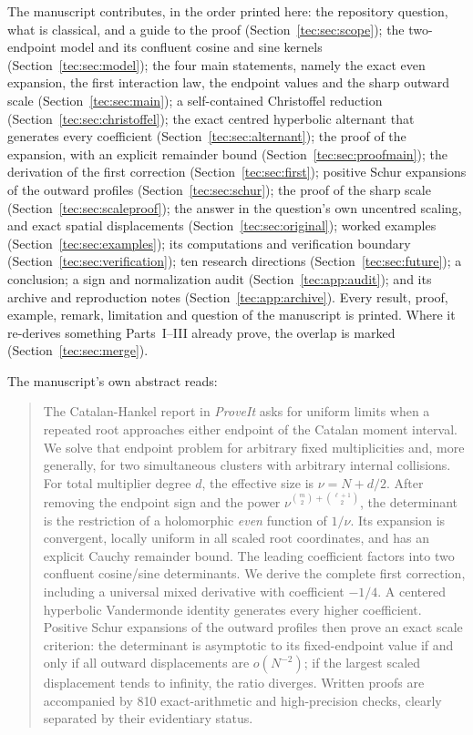 \documentclass[11pt,a4paper]{article}
\numberwithin{equation}{section}
\theoremstyle{definition}
\theoremstyle{remark}
\begin{document}
The manuscript contributes, in the order printed here: the repository
question, what is classical, and a guide to the proof
(Section~\ref{tec:sec:scope}); the two-endpoint model and its confluent
cosine and sine kernels (Section~\ref{tec:sec:model}); the four main
statements, namely the exact even expansion, the first interaction law, the
endpoint values and the sharp outward scale (Section~\ref{tec:sec:main});
a self-contained Christoffel reduction (Section~\ref{tec:sec:christoffel});
the exact centred hyperbolic alternant that generates every coefficient
(Section~\ref{tec:sec:alternant}); the proof of the expansion, with an
explicit remainder bound (Section~\ref{tec:sec:proofmain}); the derivation
of the first correction (Section~\ref{tec:sec:first}); positive Schur
expansions of the outward profiles (Section~\ref{tec:sec:schur}); the
proof of the sharp scale (Section~\ref{tec:sec:scaleproof}); the answer in
the question's own uncentred scaling, and exact spatial displacements
(Section~\ref{tec:sec:original}); worked examples
(Section~\ref{tec:sec:examples}); its computations and verification
boundary (Section~\ref{tec:sec:verification}); ten research directions
(Section~\ref{tec:sec:future}); a conclusion; a sign and normalization
audit (Section~\ref{tec:app:audit}); and its archive and reproduction
notes (Section~\ref{tec:app:archive}).  Every result, proof, example,
remark, limitation and question of the manuscript is printed.  Where it
re-derives something Parts~I--III already prove, the overlap is marked
(Section~\ref{tec:sec:merge}).

The manuscript's own abstract reads:
\begin{quote}\small
The Catalan-Hankel report in \textit{ProveIt} asks for uniform limits when
a repeated root approaches either endpoint of the Catalan moment interval.
We solve that endpoint problem for arbitrary fixed multiplicities and, more
generally, for two simultaneous clusters with arbitrary internal
collisions. For total multiplier degree $d$, the effective size is
$\nu=N+d/2$. After removing the endpoint sign and the power
$\nu^{\binom m2+\binom{\ell+1}2}$, the determinant is the restriction of a
holomorphic \emph{even} function of $1/\nu$. Its expansion is convergent,
locally uniform in all scaled root coordinates, and has an explicit
Cauchy remainder bound. The leading coefficient factors into two
confluent cosine/sine determinants. We derive the complete first
correction, including a universal mixed derivative with coefficient
$-1/4$. A centered hyperbolic Vandermonde identity generates every higher
coefficient. Positive Schur expansions of the outward profiles then prove
an exact scale criterion: the determinant is asymptotic to its
fixed-endpoint value if and only if all outward displacements are
$o(N^{-2})$; if the largest scaled displacement tends to infinity, the
ratio diverges. Written proofs are accompanied by 810 exact-arithmetic
and high-precision checks, clearly separated by their evidentiary status.
\end{quote}
\end{document}
